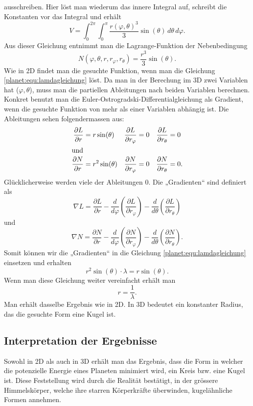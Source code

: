 ausschreiben.
Hier löst man wiederum das innere Integral auf, schreibt die Konstanten vor das Integral und erhält
\begin{equation*}
	V = \int_{0}^{2\pi}\int_{0}^{\pi}\frac{r(\varphi,\theta)^3}{3} \sin (\theta) \, d\theta \, d\varphi.
\end{equation*}
Aus dieser Gleichung entnimmt man die Lagrange-Funktion der Nebenbedingung
\begin{equation*}
	N(\varphi,\theta ,r,r_\varphi,r_\theta) = \frac{r^3}{3} \sin (\theta).
\end{equation*}
Wie in 2D findet man die gesuchte Funktion, wenn man die Gleichung \eqref{planet:equ:lamdagleichung} löst.
Da man in der Berechung im 3D zwei Variablen hat (\(\varphi,\theta\)), muss man die partiellen Ableitungen nach beiden Variablen berechnen.
Konkret benutzt man die Euler-Ostrogradski-Differentialgleichung als Gradient, wenn die gesuchte Funktion von mehr als einer Variablen abhängig ist.
Die Ableitungen sehen folgendermassen aus:
\begin{align*}
	\frac{\partial L}{\partial r} &= r  \sin (\theta)& \frac{\partial L}{\partial r_\varphi} &= 0& \frac{\partial L}{\partial r_\theta} &= 0 \\
\intertext{und}
	\frac{\partial N}{\partial r} &= r^2\sin (\theta)&	\frac{\partial N}{\partial r_\varphi} &= 0&	\frac{\partial N}{\partial r_\theta} &= 0.
\end{align*}
Glücklicherweise werden viele der Ableitungen 0.
Die „Gradienten“ sind definiert als
\begin{equation*}
	\nabla L =  \frac{\partial L}{\partial r} 
	-\frac{d}{d\varphi}\left( \frac{\partial L}{\partial r_\varphi} \right)
	-\frac{d}{d\theta}\left( \frac{\partial L}{\partial r_\theta} \right)
\end{equation*}
und
\begin{equation*}
	\nabla N=  \frac{\partial N}{\partial r} 
	-\frac{d}{d\varphi}\left( \frac{\partial N}{\partial r_\varphi} \right)
	-\frac{d}{d\theta}\left( \frac{\partial N}{\partial r_\theta} \right).
\end{equation*}
Somit können wir die „Gradienten“ in die Gleichung \eqref{planet:equ:lamdagleichung} einsetzen und erhalten
\begin{equation*}
	r^2\sin (\theta) \cdot \lambda = r \sin (\theta).
\end{equation*}
Wenn man diese Gleichung weiter vereinfacht erhält man
\begin{equation*}
	r = \frac{1}{\lambda}.
\end{equation*}
Man erhält dasselbe Ergebnis wie in 2D.
In 3D bedeutet ein konstanter Radius, das die gesuchte Form eine Kugel ist.

\subsection{Interpretation der Ergebnisse}
Sowohl in 2D als auch in 3D erhält man das Ergebnis, dass die Form in welcher die potenzielle Energie eines Planeten minimiert wird, ein Kreis bzw. eine Kugel ist.
Diese Feststellung wird durch die Realität bestätigt, in der grössere Himmelskörper, welche ihre starren Körperkräfte überwinden, kugelähnliche Formen annehmen.

